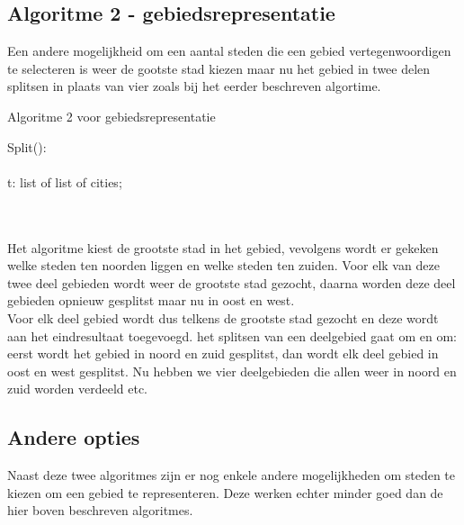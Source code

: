 \documentclass[twoside,openright]{uva-bachelor-thesis}
\begin{document}
		\subsection{Algoritme 2 - gebiedsrepresentatie}
			Een andere mogelijkheid om een aantal steden die een gebied vertegenwoordigen te selecteren is weer de gootste stad kiezen maar nu het gebied in twee delen splitsen in plaats van vier zoals bij het eerder beschreven algortime.
			\begin{algorithm}
				\caption{Algoritme 2 voor gebiedsrepresentatie}
				\mbox{Split():}\\[0.5cm]
				\mbox{}\\
				t: list of list of cities;\\
				\mbox{}\\
			\end{algorithm}\\[0.5cm]
			Het algoritme kiest de grootste stad in het gebied, vevolgens wordt er gekeken welke steden ten noorden liggen en welke steden ten zuiden. Voor elk van deze twee deel gebieden wordt weer de grootste stad gezocht, daarna worden deze deel gebieden opnieuw gesplitst maar nu in oost en west.\\[0.5cm]
			Voor elk deel gebied wordt dus telkens de grootste stad gezocht en deze wordt aan het eindresultaat toegevoegd. het splitsen van een deelgebied gaat om en om: eerst wordt het gebied in noord en zuid gesplitst, dan wordt elk deel gebied in oost en west gesplitst. Nu hebben we vier deelgebieden die allen weer in noord en zuid worden verdeeld etc.
		\subsection{Andere opties}
			Naast deze twee algoritmes zijn er nog enkele andere mogelijkheden om steden te kiezen om een gebied te representeren. Deze werken echter minder goed dan de hier boven beschreven algoritmes.
\end{document}
